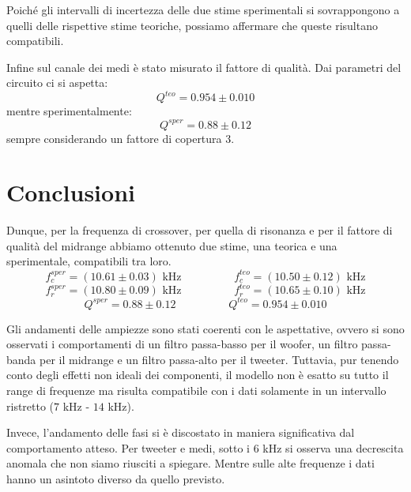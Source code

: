 \documentclass[12pt,italian]{article}
\begin{document}
\noindent
Poiché gli intervalli di incertezza delle due stime sperimentali si
sovrappongono a quelli delle rispettive stime teoriche, possiamo affermare che
queste risultano compatibili.

Infine sul canale dei medi è stato misurato il fattore di qualità. Dai
parametri del circuito ci si aspetta:
\begin{equation*}
	Q^{teo} = 0.954 \pm 0.010
\end{equation*}
mentre sperimentalmente:
\begin{equation*}
	Q^{sper} = 0.88 \pm 0.12
\end{equation*}
sempre considerando un fattore di copertura $3$.

\section*{Conclusioni}

Dunque, per la frequenza di crossover, per quella di risonanza e per il fattore
di qualità del midrange abbiamo ottenuto due stime, una teorica e una
sperimentale, compatibili tra loro.
\begin{equation*}
	f_{c}^{sper} = (10.61 \pm 0.03) \text{ kHz} \hspace{2cm}
	f_{c}^{teo} = (10.50 \pm 0.12) \text{ kHz}
\end{equation*}
\begin{equation*}
	f_{r}^{sper} = (10.80 \pm 0.09) \text{ kHz}
	\hspace{2cm} f_{r}^{teo} = (10.65 \pm 0.10) \text{ kHz}
\end{equation*}
\begin{equation*}
	Q^{sper} = 0.88 \pm 0.12 \hspace{2cm} Q^{teo} = 0.954 \pm 0.010
\end{equation*}

Gli andamenti delle ampiezze sono stati coerenti con le aspettative, ovvero si
sono osservati i comportamenti di un filtro passa-basso per il woofer, un
filtro passa-banda per il midrange e un filtro passa-alto per il tweeter.
Tuttavia, pur tenendo conto degli effetti non ideali dei componenti, il modello
non è esatto su tutto il range di frequenze ma risulta compatibile con i dati
solamente in un intervallo ristretto ($7$ kHz - $14$ kHz).

Invece, l'andamento delle fasi si è discostato in maniera significativa dal
comportamento atteso. Per tweeter e medi, sotto i $6$ kHz si osserva una
decrescita anomala che non siamo riusciti a spiegare. Mentre sulle alte
frequenze i dati hanno un asintoto diverso da quello previsto.
\end{document}

